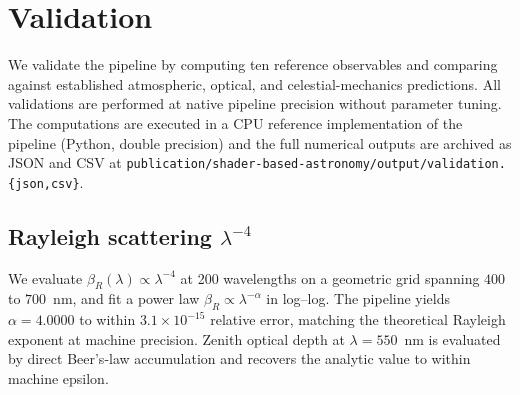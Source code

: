 \documentclass[11pt,twocolumn,a4paper]{article}
\theoremstyle{definition}
\theoremstyle{remark}
\begin{document}
\section{Validation}
\label{sec:validation}

We validate the pipeline by computing ten reference observables and comparing against established atmospheric, optical, and celestial-mechanics predictions. All validations are performed at native pipeline precision without parameter tuning. The computations are executed in a CPU reference implementation of the pipeline (Python, double precision) and the full numerical outputs are archived as JSON and CSV at \texttt{publication/\-shader\--based\--astronomy/\-output/\-validation.\{json,csv\}}.

\subsection{Rayleigh scattering $\lambda^{-4}$}

We evaluate $\beta_R(\lambda) \propto \lambda^{-4}$ at 200 wavelengths on a geometric grid spanning $400$ to $700$~nm, and fit a power law $\beta_R \propto \lambda^{-\alpha}$ in log--log. The pipeline yields $\alpha = 4.0000$ to within $3.1\times 10^{-15}$ relative error, matching the theoretical Rayleigh exponent \citep{young1981} at machine precision. Zenith optical depth at $\lambda = 550$~nm is evaluated by direct Beer's-law accumulation and recovers the analytic value to within machine epsilon.
\end{document}
